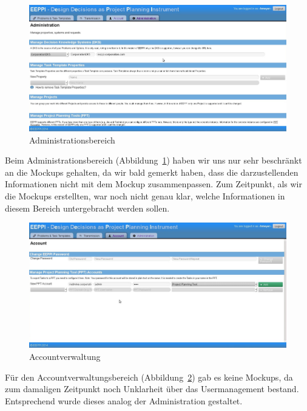 		
		\begin{figure}[H]
			\centering
			\includegraphics[width=\linewidth]{tutorial/img/administrationDKS_cut.jpg}
			\caption{Administrationsbereich}
			\label{fig:eeppiAdministration}
		\end{figure}	
		
		Beim Administrationsbereich (Abbildung~\ref{fig:eeppiAdministration}) haben wir uns nur sehr beschränkt an die Mockups gehalten, 
		da wir bald gemerkt haben, dass die darzustellenden Informationen nicht mit dem Mockup zusammenpassen.
		Zum Zeitpunkt, als wir die Mockups erstellten, 
		war noch nicht genau klar, welche Informationen in diesem Bereich untergebracht werden sollen.		
		
		
		\begin{figure}[H]
			\centering
			\includegraphics[width=\linewidth]{tutorial/img/accountPPTAccount_cut.jpg}
			\caption{Accountverwaltung}
			\label{fig:eeppiAccountManagement}
		\end{figure}	
		
		Für den Accountverwaltungsbereich (Abbildung~\ref{fig:eeppiAccountManagement}) gab es keine Mockups, da zum damaligen Zeitpunkt noch Unklarheit über das Usermanagement bestand.
		Entsprechend wurde dieses analog der Administration gestaltet.
		
